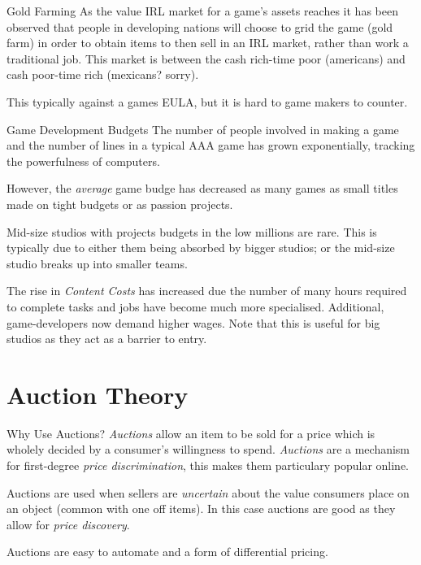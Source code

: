 \documentclass[11pt,a4paper]{article}
\begin{document}
\begin{remark}{Gold Farming}
  As the value IRL market for a game's assets reaches it has been observed that people in developing nations will choose to grid the game (gold farm) in order to obtain items to then sell in an IRL market, rather than work a traditional job. This market is between the cash rich-time poor (americans) and cash poor-time rich (mexicans? sorry).
  \par This typically against a games EULA, but it is hard to game makers to counter.
\end{remark}

\begin{remark}{Game Development Budgets}
  The number of people involved in making a game and the number of lines in a typical AAA game has grown exponentially, tracking the powerfulness of computers.
  \par However, the \textit{average} game budge has decreased as many games as small titles made on tight budgets or as passion projects.
  \par Mid-size studios with projects budgets in the low millions are rare. This is typically due to either them being absorbed by bigger studios; or the mid-size studio breaks up into smaller teams.
  \par The rise in \textit{Content Costs} has increased due the number of many hours required to complete tasks and jobs have become much more specialised. Additional, game-developers now demand higher wages. Note that this is useful for big studios as they act as a barrier to entry.
\end{remark}

\section{Auction Theory}

\begin{remark}{Why Use Auctions?}
  \textit{Auctions} allow an item to be sold for a price which is wholely decided by a consumer's willingness to spend. \textit{Auctions} are a mechanism for first-degree \textit{price discrimination}, this makes them particulary popular online.
  \par Auctions are used when sellers are \textit{uncertain} about the value consumers place on an object (common with one off items). In this case auctions are good as they allow for \textit{price discovery}.
  \par Auctions are easy to automate and a form of differential pricing.
\end{remark}
\end{document}
